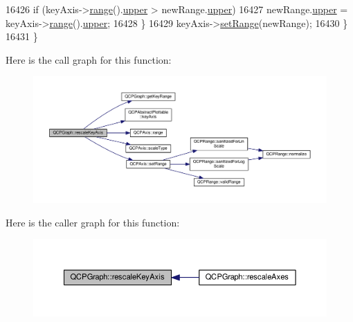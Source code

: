 \begin{DoxyCode}
16426       \textcolor{keywordflow}{if} (keyAxis->\hyperlink{class_q_c_p_axis_ab1ea79a4f5ea4cf42620f8f51c477ac4}{range}().\hyperlink{class_q_c_p_range_ae44eb3aafe1d0e2ed34b499b6d2e074f}{upper} > newRange.\hyperlink{class_q_c_p_range_ae44eb3aafe1d0e2ed34b499b6d2e074f}{upper})
16427         newRange.\hyperlink{class_q_c_p_range_ae44eb3aafe1d0e2ed34b499b6d2e074f}{upper} = keyAxis->\hyperlink{class_q_c_p_axis_ab1ea79a4f5ea4cf42620f8f51c477ac4}{range}().\hyperlink{class_q_c_p_range_ae44eb3aafe1d0e2ed34b499b6d2e074f}{upper};
16428     \}
16429     keyAxis->\hyperlink{class_q_c_p_axis_aebdfea5d44c3a0ad2b4700cd4d25b641}{setRange}(newRange);
16430   \}
16431 \}
\end{DoxyCode}


Here is the call graph for this function\+:\nopagebreak
\begin{figure}[H]
\begin{center}
\leavevmode
\includegraphics[width=350pt]{class_q_c_p_graph_a2108a729046b0ab6e0516afb249dab13_cgraph}
\end{center}
\end{figure}




Here is the caller graph for this function\+:\nopagebreak
\begin{figure}[H]
\begin{center}
\leavevmode
\includegraphics[width=350pt]{class_q_c_p_graph_a2108a729046b0ab6e0516afb249dab13_icgraph}
\end{center}
\end{figure}


\hypertarget{class_q_c_p_graph_a2ba0e1df416486d7e74299ef8cf68bba}{}
